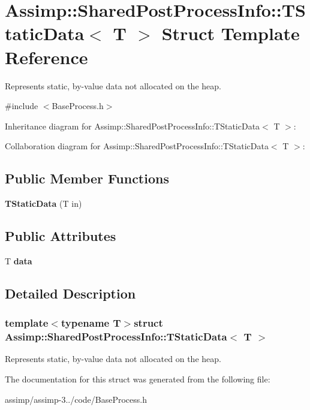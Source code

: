\hypertarget{struct_assimp_1_1_shared_post_process_info_1_1_t_static_data}{\section{Assimp\+:\+:Shared\+Post\+Process\+Info\+:\+:T\+Static\+Data$<$ T $>$ Struct Template Reference}
\label{struct_assimp_1_1_shared_post_process_info_1_1_t_static_data}
}


Represents static, by-\/value data not allocated on the heap.  




{\ttfamily \#include $<$Base\+Process.\+h$>$}



Inheritance diagram for Assimp\+:\+:Shared\+Post\+Process\+Info\+:\+:T\+Static\+Data$<$ T $>$\+:


Collaboration diagram for Assimp\+:\+:Shared\+Post\+Process\+Info\+:\+:T\+Static\+Data$<$ T $>$\+:
\subsection*{Public Member Functions}
\begin{DoxyCompactItemize}
\item 
\hypertarget{struct_assimp_1_1_shared_post_process_info_1_1_t_static_data_ab69877580c06c5332c06a5588dbd21f9}{{\bfseries T\+Static\+Data} (T in)}\label{struct_assimp_1_1_shared_post_process_info_1_1_t_static_data_ab69877580c06c5332c06a5588dbd21f9}

\end{DoxyCompactItemize}
\subsection*{Public Attributes}
\begin{DoxyCompactItemize}
\item 
\hypertarget{struct_assimp_1_1_shared_post_process_info_1_1_t_static_data_af9d24417f69e1fd1c3b17b8945f7a66f}{T {\bfseries data}}\label{struct_assimp_1_1_shared_post_process_info_1_1_t_static_data_af9d24417f69e1fd1c3b17b8945f7a66f}

\end{DoxyCompactItemize}


\subsection{Detailed Description}
\subsubsection*{template$<$typename T$>$struct Assimp\+::\+Shared\+Post\+Process\+Info\+::\+T\+Static\+Data$<$ T $>$}

Represents static, by-\/value data not allocated on the heap. 

The documentation for this struct was generated from the following file\+:\begin{DoxyCompactItemize}
\item 
assimp/assimp-\/3../code/Base\+Process.\+h\end{DoxyCompactItemize}
